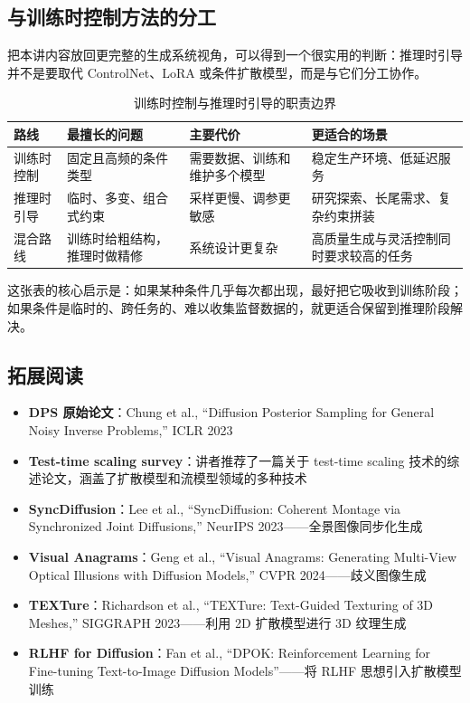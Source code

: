 \documentclass[a4paper]{article}
\begin{document}
\subsection{与训练时控制方法的分工}

把本讲内容放回更完整的生成系统视角，可以得到一个很实用的判断：推理时引导并不是要取代 ControlNet、LoRA 或条件扩散模型，而是与它们分工协作。

\begin{table}[H]
\centering
\begin{tabular}{p{} p{} p{} p{}}
\toprule
路线 & 最擅长的问题 & 主要代价 & 更适合的场景 \\
\midrule
训练时控制 & 固定且高频的条件类型 & 需要数据、训练和维护多个模型 & 稳定生产环境、低延迟服务 \\
推理时引导 & 临时、多变、组合式约束 & 采样更慢、调参更敏感 & 研究探索、长尾需求、复杂约束拼装 \\
混合路线 & 训练时给粗结构，推理时做精修 & 系统设计更复杂 & 高质量生成与灵活控制同时要求较高的任务 \\
\bottomrule
\end{tabular}
\caption{训练时控制与推理时引导的职责边界}
\end{table}

这张表的核心启示是：如果某种条件几乎每次都出现，最好把它吸收到训练阶段；如果条件是临时的、跨任务的、难以收集监督数据的，就更适合保留到推理阶段解决。

\subsection{拓展阅读}

\begin{itemize}
    \item \textbf{DPS 原始论文}：Chung et al., ``Diffusion Posterior Sampling for General Noisy Inverse Problems,'' ICLR 2023
    \item \textbf{Test-time scaling survey}：讲者推荐了一篇关于 test-time scaling 技术的综述论文，涵盖了扩散模型和流模型领域的多种技术
    \item \textbf{SyncDiffusion}：Lee et al., ``SyncDiffusion: Coherent Montage via Synchronized Joint Diffusions,'' NeurIPS 2023——全景图像同步化生成
    \item \textbf{Visual Anagrams}：Geng et al., ``Visual Anagrams: Generating Multi-View Optical Illusions with Diffusion Models,'' CVPR 2024——歧义图像生成
    \item \textbf{TEXTure}：Richardson et al., ``TEXTure: Text-Guided Texturing of 3D Meshes,'' SIGGRAPH 2023——利用 2D 扩散模型进行 3D 纹理生成
    \item \textbf{RLHF for Diffusion}：Fan et al., ``DPOK: Reinforcement Learning for Fine-tuning Text-to-Image Diffusion Models''——将 RLHF 思想引入扩散模型训练
\end{itemize}

\end{document}
